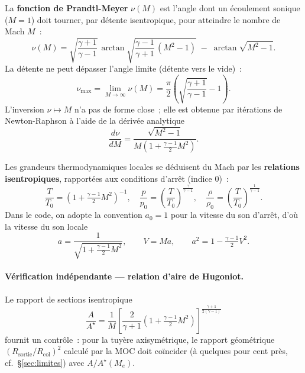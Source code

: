 \documentclass[11pt,a4paper]{article}
\newcommand{\ppar}[1]{\left(#1\right)}
\begin{document}
La \textbf{fonction de Prandtl-Meyer} $\nu(M)$ est l'angle dont un écoulement
sonique ($M=1$) doit tourner, par détente isentropique, pour atteindre le
nombre de Mach $M$~:
\begin{equation}
  \nu(M) = \sqrt{\frac{\gamma+1}{\gamma-1}}\,
           \arctan\!\sqrt{\frac{\gamma-1}{\gamma+1}\,(M^2-1)}
           \;-\; \arctan\!\sqrt{M^2-1}.
  \label{eq:pm}
\end{equation}
La détente ne peut dépasser l'angle limite (détente vers le vide)~:
\begin{equation}
  \nu_{\max} = \lim_{M\to\infty} \nu(M)
             = \frac{\pi}{2}\ppar{\sqrt{\frac{\gamma+1}{\gamma-1}} - 1}.
\end{equation}
L'inversion $\nu \mapsto M$ n'a pas de forme close~; elle est obtenue par
itérations de Newton-Raphson à l'aide de la dérivée analytique
\begin{equation}
  \frac{d\nu}{dM} = \frac{\sqrt{M^2-1}}{M\ppar{1 + \tfrac{\gamma-1}{2}M^2}}.
  \label{eq:dpm}
\end{equation}

Les grandeurs thermodynamiques locales se déduisent du Mach par les
\textbf{relations isentropiques}, rapportées aux conditions d'arrêt
(indice $0$)~:
\begin{equation}
  \frac{T}{T_0} = \ppar{1 + \tfrac{\gamma-1}{2}M^2}^{-1},
  \quad
  \frac{p}{p_0} = \ppar{\frac{T}{T_0}}^{\frac{\gamma}{\gamma-1}},
  \quad
  \frac{\rho}{\rho_0} = \ppar{\frac{T}{T_0}}^{\frac{1}{\gamma-1}}.
  \label{eq:isen}
\end{equation}
Dans le code, on adopte la convention $a_0 = 1$ pour la vitesse du son d'arrêt,
d'où la vitesse du son locale
\begin{equation}
  a = \frac{1}{\sqrt{1 + \tfrac{\gamma-1}{2}M^2}},
  \qquad V = M a, \qquad a^2 = 1 - \tfrac{\gamma-1}{2}V^2 .
  \label{eq:a0}
\end{equation}

\paragraph{Vérification indépendante --- relation d'aire de Hugoniot.}
Le rapport de sections isentropique
\begin{equation}
  \frac{A}{A^\star} = \frac{1}{M}
    \left[\frac{2}{\gamma+1}\ppar{1+\tfrac{\gamma-1}{2}M^2}
    \right]^{\frac{\gamma+1}{2(\gamma-1)}}
  \label{eq:hugoniot}
\end{equation}
fournit un contrôle~: pour la tuyère axisymétrique, le rapport géométrique
$(R_{\text{sortie}}/R_{\text{col}})^2$ calculé par la MOC doit coïncider (à
quelques pour cent près, cf.~§\ref{sec:limites}) avec $A/A^\star(M_e)$.
\end{document}
